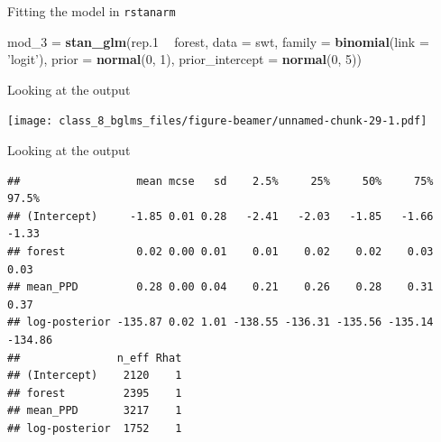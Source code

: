\documentclass[ignorenonframetext,]{beamer}
\newenvironment{Shaded}{\begin{snugshade}}{\end{snugshade}}
\newcommand{\KeywordTok}[1]{\textcolor[rgb]{0.13,0.29,0.53}{\textbf{#1}}}
\newcommand{\DataTypeTok}[1]{\textcolor[rgb]{0.13,0.29,0.53}{#1}}
\newcommand{\DecValTok}[1]{\textcolor[rgb]{0.00,0.00,0.81}{#1}}
\newcommand{\StringTok}[1]{\textcolor[rgb]{0.31,0.60,0.02}{#1}}
\newcommand{\OperatorTok}[1]{\textcolor[rgb]{0.81,0.36,0.00}{\textbf{#1}}}
\newcommand{\NormalTok}[1]{#1}
\begin{document}
\begin{frame}[fragile]{Fitting the model in \texttt{rstanarm}}

\begin{Shaded}
\begin{Highlighting}[]
\NormalTok{mod_}\DecValTok{3}\NormalTok{ =}\StringTok{ }\KeywordTok{stan_glm}\NormalTok{(rep.}\DecValTok{1} \OperatorTok{~}\StringTok{ }\NormalTok{forest, }
                 \DataTypeTok{data =}\NormalTok{ swt,}
                 \DataTypeTok{family =} \KeywordTok{binomial}\NormalTok{(}\DataTypeTok{link =} \StringTok{'logit'}\NormalTok{),}
                 \DataTypeTok{prior =} \KeywordTok{normal}\NormalTok{(}\DecValTok{0}\NormalTok{, }\DecValTok{1}\NormalTok{),}
                 \DataTypeTok{prior_intercept =} \KeywordTok{normal}\NormalTok{(}\DecValTok{0}\NormalTok{, }\DecValTok{5}\NormalTok{))}
\end{Highlighting}
\end{Shaded}

\end{frame}

\begin{frame}{Looking at the output}

\texttt{[image: class\_8\_bglms\_files/figure-beamer/unnamed-chunk-29-1.pdf]}

\end{frame}

\begin{frame}[fragile]{Looking at the output}

\tiny

\begin{verbatim}
##                  mean mcse   sd    2.5%     25%     50%     75%   97.5%
## (Intercept)     -1.85 0.01 0.28   -2.41   -2.03   -1.85   -1.66   -1.33
## forest           0.02 0.00 0.01    0.01    0.02    0.02    0.03    0.03
## mean_PPD         0.28 0.00 0.04    0.21    0.26    0.28    0.31    0.37
## log-posterior -135.87 0.02 1.01 -138.55 -136.31 -135.56 -135.14 -134.86
##               n_eff Rhat
## (Intercept)    2120    1
## forest         2395    1
## mean_PPD       3217    1
## log-posterior  1752    1
\end{verbatim}

\end{frame}
\end{document}
